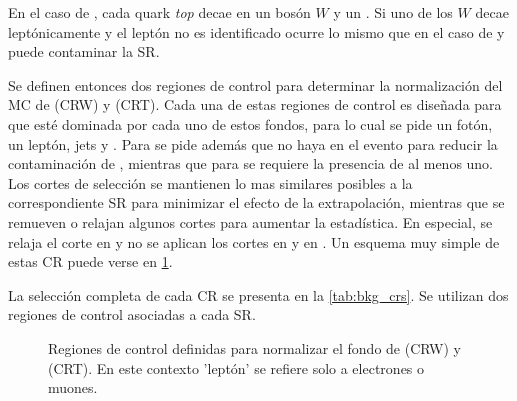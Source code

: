 En el caso de {\ttgam}, cada quark \emph{top} decae en un bosón $W$ y un
{\bjet}. Si uno de los $W$ decae leptónicamente y el leptón no es identificado
ocurre lo mismo que en el caso de {\wgam} y puede contaminar la SR.

Se definen entonces dos regiones de control para determinar la normalización del
MC de {\wgam} (CRW) y {\ttgam} (CRT). Cada una de estas regiones de control es
diseñada para que esté dominada por cada uno de estos fondos, para lo cual se
pide un fotón, un leptón, jets y \met. Para {\CRW} se pide además que no haya
{\bjets} en el evento para reducir la contaminación de {\ttgam}, mientras que
para {\CRT} se requiere la presencia de al menos uno.
Los cortes de selección se mantienen lo
mas similares posibles a la correspondiente SR para minimizar el efecto de la
extrapolación, mientras que se remueven o relajan
algunos cortes para aumentar la estadística. En especial, se relaja el corte en
{\met} y no se aplican los cortes en {\HT} y en {\rt}. Un esquema muy simple de
estas CR puede verse en \cref{fig:bkg_crt_crw}.

La selección completa de cada CR se presenta en la \cref{tab:bkg_crs}. Se utilizan
dos regiones de control asociadas a cada SR.

\begin{figure}[!htbp]
  \centering

  \resizebox{0.5\textwidth}{!}{}

  \caption{Regiones de control definidas para normalizar el fondo de {\wgam} (CRW) y {\ttgam} (CRT). En este contexto 'leptón' se refiere solo a electrones o muones.}
  \label{fig:bkg_crt_crw}
\end{figure}



